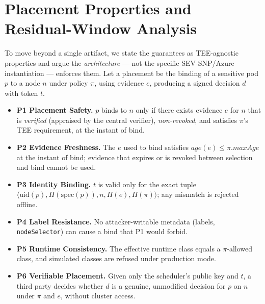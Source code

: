 \section{Placement Properties and Residual-Window Analysis}
\label{sec:properties}

To move beyond a single artifact, we state the guarantees as TEE-agnostic
properties and argue the \emph{architecture} --- not the specific SEV-SNP/Azure
instantiation --- enforces them. Let a placement be the binding of a sensitive
pod $p$ to a node $n$ under policy $\pi$, using evidence $e$, producing a signed
decision $d$ with token $t$.

\begin{itemize}
  \item \textbf{P1 Placement Safety.} $p$ binds to $n$ only if there exists evidence
  $e$ for $n$ that is \emph{verified} (appraised by the central verifier),
  \emph{non-revoked}, and satisfies $\pi$'s TEE requirement, at the instant of
  bind.
  \item \textbf{P2 Evidence Freshness.} The $e$ used to bind satisfies
  $\mathit{age}(e) \le \pi.\mathit{maxAge}$ at the instant of bind; evidence that
  expires or is revoked between selection and bind cannot be used.
  \item \textbf{P3 Identity Binding.} $t$ is valid only for the exact tuple
  $\langle \mathrm{uid}(p), H(\mathrm{spec}(p)), n, H(e), H(\pi)\rangle$; any
  mismatch is rejected offline.
  \item \textbf{P4 Label Resistance.} No attacker-writable metadata (labels,
  \texttt{nodeSelector}) can cause a bind that P1 would forbid.
  \item \textbf{P5 Runtime Consistency.} The effective runtime class equals a
  $\pi$-allowed class, and simulated classes are refused under production mode.
  \item \textbf{P6 Verifiable Placement.} Given only the scheduler's public key and $t$,
  a third party decides whether $d$ is a genuine, unmodified decision for $p$ on
  $n$ under $\pi$ and $e$, without cluster access.
\end{itemize}

